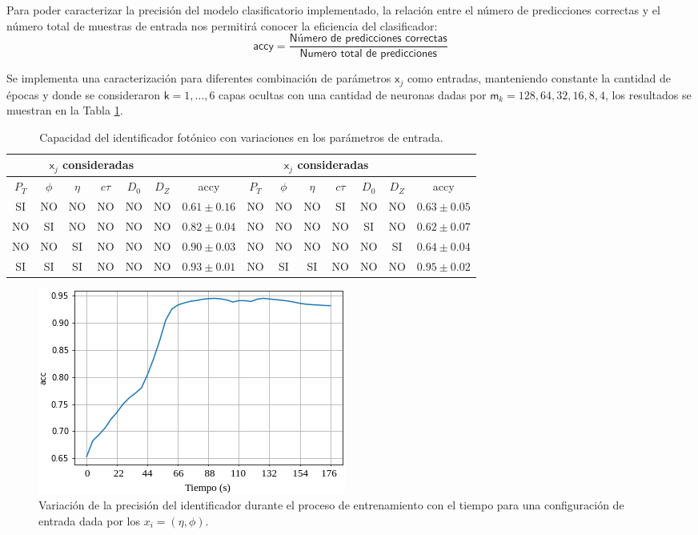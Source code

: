 Para poder caracterizar la precisión del modelo clasificatorio implementado, la relación entre el número de predicciones correctas y el número total de muestras de entrada nos permitirá conocer la eficiencia del clasificador:
\begin{equation}
\textsf{accy} =  \dfrac{\textsf{Número de predicciones correctas}}{\textsf{Numero total de predicciones}}
\end{equation}

Se implementa una caracterización para diferentes combinación de parámetros $\textsf{x}_{j}$ como entradas, manteniendo constante la cantidad de épocas y donde se consideraron $\textsf{k}=1,\ldots,6$ capas ocultas con una cantidad de neuronas dadas por $\textsf{m}_k = 128, 64, 32, 16, 8, 4$, los resultados se muestran en la Tabla \ref{ajuste1}.

\begin{table}[!h]
\footnotesize
\centering
\begin{tabular}{|cccccc|c||cccccc|c|}
\toprule
\multicolumn{6}{|c|}{$\textsf{x}_j$ consideradas} &  &
\multicolumn{6}{|c|}{$\textsf{x}_j$ consideradas} &  \\
\midrule
$P_T$ & $\phi$ & $\eta$ & $c\tau$ & $D_0$ & $D_Z$  & \textsf{accy} &
$P_T$ & $\phi$ & $\eta$ & $c\tau$ & $D_0$ & $D_Z$  & \textsf{accy} \\
\midrule
SI & NO & NO & NO & NO & NO & $0.61 \pm 0.16$ & 
NO & NO & NO & SI & NO & NO & $0.63 \pm 0.05$\\
NO & SI & NO & NO & NO & NO & $0.82 \pm 0.04$ & 
NO & NO & NO & NO & SI & NO & $0.62 \pm 0.07$\\  
NO & NO & SI & NO & NO & NO & $0.90 \pm 0.03$ & 
NO & NO & NO & NO & NO & SI & $0.64 \pm 0.04$\\
\bottomrule
SI & SI & SI & NO & NO & NO & $0.93 \pm 0.01$ &
NO & SI & SI & NO & NO & NO & $0.95 \pm 0.02$\\
\bottomrule 
\end{tabular}%
\caption{Capacidad del identificador fotónico con variaciones en los parámetros de entrada.}
\label{ajuste1}
\end{table}

\begin{figure}[!h]
\centering
\includegraphics[width=.5\textwidth]{Cap4/imagenes/acc.png}
\caption{Variación de la precisión del identificador durante el proceso de entrenamiento con el tiempo para una configuración de entrada dada por los $x_i = (\eta, \phi)$.}
\label{identificador0}
\end{figure}

